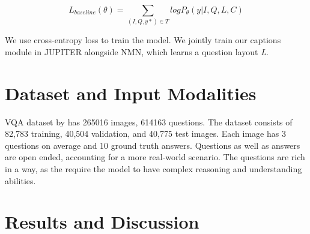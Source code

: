 \begin{itemize}
\begin{equation}
    L_{baseline}(\theta) = \sum_{(I, Q, y*) \in T} logP_\theta(y | I, Q, L, C) 
\end{equation}

\end{itemize}
We use cross-entropy loss to train the model. We jointly train our captions module in JUPITER alongside NMN, which learns a question layout \textit{L}. 

\section{Dataset and Input Modalities}
VQA dataset by \cite{AntolALMBZP15} has 265016 images, 614163
questions.  The dataset consists of  82,783 training, 40,504 validation, and 40,775 test images. Each image has 3 questions on average and 10 ground truth answers. Questions as well as answers are open ended, accounting for a more real-world scenario. The questions are rich in a way, as the require the model to have complex reasoning and understanding abilities.


\section{Results and Discussion}


